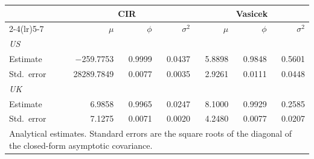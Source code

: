 \begin{tabular}{lrrrrrr}
\toprule
 & \multicolumn{3}{c}{CIR} & \multicolumn{3}{c}{Vasicek} \\
\cmidrule(lr){2-4}\cmidrule(lr){5-7}
 & $\mu$ & $\phi$ & $\sigma^2$ & $\mu$ & $\phi$ & $\sigma^2$ \\
\midrule
\multicolumn{7}{l}{\textit{US}} \\
Estimate & \ensuremath{-}259.7753 & 0.9999 & 0.0437 & 5.8898 & 0.9848 & 0.5601 \\
Std.\ error & 28289.7849 & 0.0077 & 0.0035 & 2.9261 & 0.0111 & 0.0448 \\
\midrule
\multicolumn{7}{l}{\textit{UK}} \\
Estimate & 6.9858 & 0.9965 & 0.0247 & 8.1000 & 0.9929 & 0.2585 \\
Std.\ error & 7.1275 & 0.0071 & 0.0020 & 4.2480 & 0.0077 & 0.0207 \\
\midrule
\multicolumn{7}{l}{\footnotesize Analytical estimates. Standard errors are the square roots of the diagonal of the closed-form asymptotic covariance.} \\
\bottomrule
\end{tabular}
